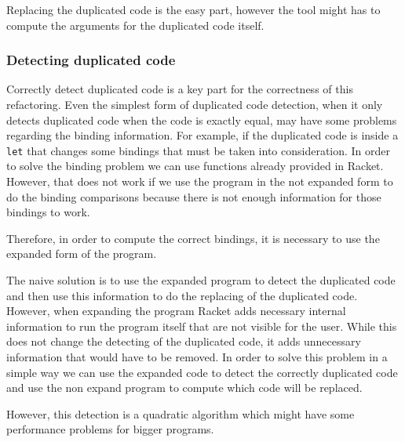 Replacing the duplicated code is the easy part, however the tool might has to compute %
the arguments for the duplicated code itself.

\subsubsection{Detecting duplicated code}
Correctly detect duplicated code is a key part for the correctness of this refactoring.
Even the simplest form of duplicated code detection, when it only detects duplicated code
when the code is exactly equal, may have some problems regarding the binding information.
For example, if the duplicated code is inside a {\tt let} that changes some bindings that must
be taken into consideration.
In order to solve the binding problem we can use functions already provided in Racket.
However, that does not work if we use the program in the not expanded
form to do the binding comparisons because there is not enough information for those bindings to work. %


Therefore, in order to compute the correct bindings, it is necessary to use the expanded form
of the program.

The naive solution is to use the expanded program to detect the duplicated
 code and then use this information to do the replacing of the duplicated code.
However, when expanding the program Racket adds necessary internal information to
run the program itself that are not visible for the user.
While this does not change the detecting of the duplicated code, it adds unnecessary information
that would have to be removed. %
In order to solve this problem in a simple way we can use the expanded code to detect
the correctly duplicated code and use the non expand program
to compute which code will be replaced.

However, this detection is a quadratic algorithm which might
have some performance problems for bigger programs.


